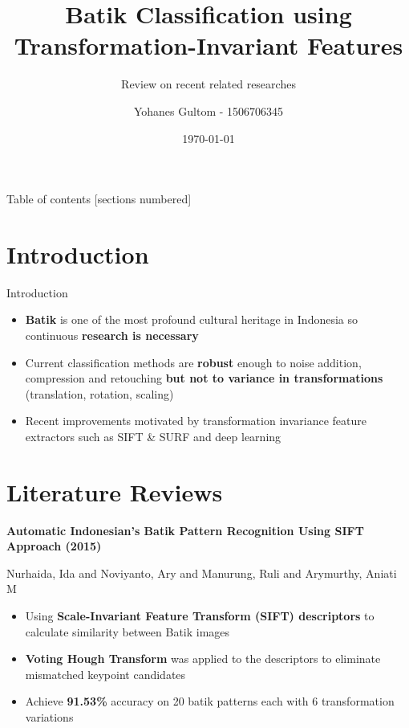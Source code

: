 \documentclass[10pt]{beamer}
\title{Batik Classification using Transformation-Invariant Features}
\subtitle{Review on recent related researches}
\date{\today}
\author{Yohanes Gultom - 1506706345}
\institute{IKO61181 Advance Image Processing}
\begin{document}
\maketitle

\begin{frame}{Table of contents}
  [sections numbered]
  \tableofcontents[hideallsubsections]
\end{frame}

\section{Introduction}

\begin{frame}{Introduction}

	\begin{itemize}[<+->]
	  \item \textbf{Batik} is one of the most profound cultural heritage in Indonesia so continuous \textbf{research is necessary}
	  
	  \item Current classification methods are \textbf{robust} enough to noise addition, compression and retouching \textbf{but not to variance in transformations} (translation, rotation, scaling) \citep{nurhaida2015automatic}
	
	  \item Recent improvements motivated by transformation invariance feature extractors such as SIFT \& SURF and deep learning
	\end{itemize} 
  
\end{frame}

\section{Literature Reviews}

\begin{frame}{\cite{nurhaida2015automatic}}
	\textbf{Automatic Indonesian's Batik Pattern Recognition Using SIFT Approach (2015)}
	
	{\small Nurhaida, Ida and Noviyanto, Ary and Manurung, Ruli and Arymurthy, Aniati M}
	
	\begin{itemize}[<+->]
		\item Using \textbf{Scale-Invariant Feature Transform (SIFT) descriptors} to calculate similarity between Batik images
		
		\item \textbf{Voting Hough Transform} was applied to the descriptors to eliminate mismatched keypoint candidates
		
		\item Achieve \textbf{91.53\%} accuracy on 20 batik patterns each with 6 transformation variations
	\end{itemize}

\end{frame}
\end{document}
